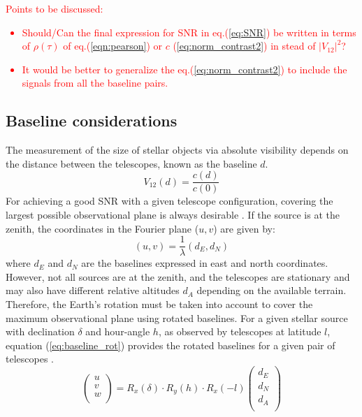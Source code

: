 \textcolor{red}{Points to be discussed: 
\begin{itemize}
\item{Should/Can the final expression for SNR in eq.(\ref{eq:SNR}) be written in terms of $\rho(\tau)$ of eq.(\ref{eqn:pearson}) or $c$ (\ref{eq:norm_contrast2}) in stead of $\vert V_{12}\vert^2$?}
\item{It would be better to generalize the eq.(\ref{eq:norm_contrast2}) to include the signals from all the baseline pairs.}
\end{itemize}}

\subsection{Baseline considerations}
The measurement of the size of stellar objects via absolute visibility depends on the distance between the telescopes, known as the baseline $d$.
\begin{equation}
	V_{12}(d) = \frac{c(d)}{c(0)}
	\label{eq:angular_size_meas}
\end{equation}
For achieving a good SNR with a given telescope configuration, covering the largest possible observational plane is always desirable \citep{acciari2020optical, abeysekara2020demonstration}. If the source is at the zenith, the coordinates in the Fourier plane ($u,v$) are given by:
\begin{equation}
	(u,v) = \frac{1}{\lambda} (d_E, d_N)
\end{equation}
where $d_E$ and $d_N$ are the baselines expressed in east and north coordinates. However, not all sources are at the zenith, and the telescopes are stationary and may also have different relative altitudes $d_A$ depending on the available terrain. Therefore, the Earth's rotation must be taken into account to cover the maximum observational plane using rotated baselines. For a given stellar source with declination $\delta$ and hour-angle $h$, as observed by telescopes at latitude $l$, equation (\ref{eq:baseline_rot}) provides the rotated baselines for a given pair of telescopes \citep{dravins2013optical, saha2020theory}.
\begin{equation}
\begin{pmatrix} u\\ v\\ w\\ \end{pmatrix} = R_x(\delta) \cdot R_y(h) \cdot R_x(-l) \begin{pmatrix} d_E \\ d_N \\ d_A \\ \end{pmatrix}
	\label{eq:baseline_rot}
\end{equation}

